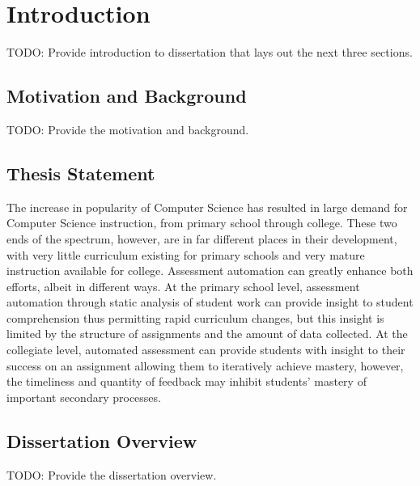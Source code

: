 \chapter{Introduction}
TODO: Provide introduction to dissertation that lays out the next three
sections.

\section{Motivation and Background}
TODO: Provide the motivation and background.

\section{Thesis Statement}
The increase in popularity of Computer Science has resulted in large demand for
Computer Science instruction, from primary school through college. These two
ends of the spectrum, however, are in far different places in their
development, with very little curriculum existing for primary schools and very
mature instruction available for college. Assessment automation can greatly
enhance both efforts, albeit in different ways. At the primary school level,
assessment automation through static analysis of student work can provide
insight to student comprehension thus permitting rapid curriculum changes, but
this insight is limited by the structure of assignments and the amount of data
collected. At the collegiate level, automated assessment can provide students
with insight to their success on an assignment allowing them to iteratively
achieve mastery, however, the timeliness and quantity of feedback may inhibit
students' mastery of important secondary processes.

\section{Dissertation Overview}
TODO: Provide the dissertation overview.
